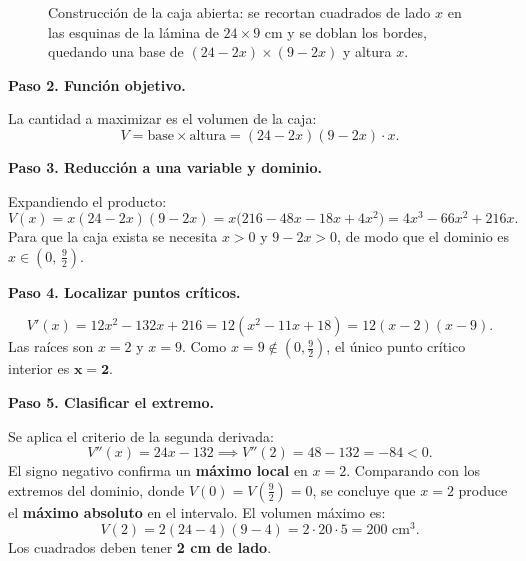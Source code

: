 \begin{example}
\begin{myproof}
\begin{figure}[H]
\caption{Construcción de la caja abierta: se recortan cuadrados de lado $x$
  en las esquinas de la lámina de $24\times 9$ cm y se doblan los bordes,
  quedando una base de $(24-2x)\times(9-2x)$ y altura $x$.}
\label{fig:caja_abierta_recorte}
\end{figure}

\textbf{Paso 2. Función objetivo.}

La cantidad a maximizar es el volumen de la caja:
\[
V = \text{base} \times \text{altura}
  = (24-2x)(9-2x)\cdot x.
\]

\textbf{Paso 3. Reducción a una variable y dominio.}

Expandiendo el producto:
\[
V(x) = x(24-2x)(9-2x)
      = x\bigl(216 - 48x - 18x + 4x^2\bigr)
      = 4x^3 - 66x^2 + 216x.
\]
Para que la caja exista se necesita $x>0$ y $9-2x>0$, de modo que
el dominio es $x\in\!\left(0,\,\tfrac{9}{2}\right)$.

\textbf{Paso 4. Localizar puntos críticos.}

\[
V'(x) = 12x^2 - 132x + 216 = 12(x^2 - 11x + 18) = 12(x-2)(x-9).
\]
Las raíces son $x=2$ y $x=9$. Como $x=9\notin\!\left(0,\tfrac{9}{2}\right)$,
el único punto crítico interior es $\boldsymbol{x=2}$.

\textbf{Paso 5. Clasificar el extremo.}

Se aplica el criterio de la segunda derivada:
\[
V''(x) = 24x - 132 \implies V''(2) = 48 - 132 = -84 < 0.
\]
El signo negativo confirma un \textbf{máximo local} en $x=2$.
Comparando con los extremos del dominio, donde $V(0)=V\!\left(\tfrac{9}{2}\right)=0$,
se concluye que $x=2$ produce el \textbf{máximo absoluto} en el
intervalo. El volumen máximo es:
\[
V(2) = 2(24-4)(9-4) = 2\cdot 20\cdot 5 = \boxed{200 \text{ cm}^3}.
\]
Los cuadrados deben tener \textbf{2 cm de lado}.
\end{myproof}
\end{example}


